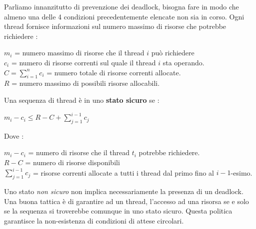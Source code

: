\documentclass[12pt, letterpaper]{article}
\begin{document}
Parliamo innanzitutto di prevenzione dei deadlock, bisogna fare in modo che almeno una delle 4 condizioni
precedentemente elencate non sia in corso. Ogni thread fornisce informazioni sul numero massimo di risorse che potrebbe 
richiedere : \begin{center}
    \(m_i\) = numero massimo di risorse che il thread \(i\) può richiedere\\
    \(c_i\) = numero di risorse correnti sul quale il thread \(i\) sta operando.\\ 
    \(C=\displaystyle \sum_{i=1}^nc_i\) = numero totale di risorse correnti allocate.\\ 
    \(R\) = numero massimo di possibili risorse allocabili.
\end{center}
Una sequenza di thread è in uno \textbf{stato sicuro} se : \begin{center}
    \(m_i-c_i\le R-C+\displaystyle\sum_{j=1}^{i-1}c_j\)
\end{center}
Dove :\begin{center}
    \(m_i-c_i\) = numero di risorse che il thread \(t_i\) potrebbe richiedere.\\ 
    \(R-C\) = numero di risorse disponibili \\
    \(\displaystyle\sum_{j=1}^{i-1}c_j\) = risorse correnti allocate a tutti i thread dal primo fino al \(i-1\)-esimo.
\end{center}
Uno stato \textit{non sicuro} non implica necessariamente la presenza di un deadlock. Una buona tattica è di garantire 
ad un thread, l'accesso ad una risorsa se e solo se la sequenza si troverebbe comunque in uno stato sicuro. Questa 
politica garantisce la non-esistenza di condizioni di attese circolari.
\end{document}
